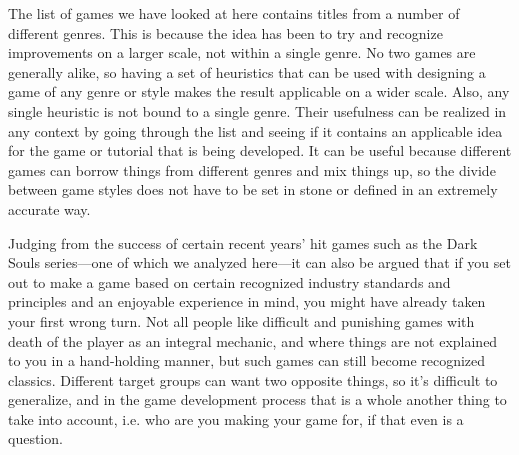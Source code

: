 The list of games we have looked at here contains titles from a number of different genres. This is because the idea has been to try and recognize improvements on a larger scale, not within a single genre. No two games are generally alike, so having a set of heuristics that can be used with designing a game of any genre or style makes the result applicable on a wider scale. Also, any single heuristic is not bound to a single genre. Their usefulness can be realized in any context by going through the list and seeing if it contains an applicable idea for the game or tutorial that is being developed. It can be useful because different games can borrow things from different genres and mix things up, so the divide between game styles does not have to be set in stone or defined in an extremely accurate way. 

Judging from the success of certain recent years' hit games such as the Dark Souls series---one of which we analyzed here---it can also be argued that if you set out to make a game based on certain recognized industry standards and principles and an enjoyable experience in mind, you might have already taken your first wrong turn. Not all people like difficult and punishing games with death of the player as an integral mechanic, and where things are not explained to you in a hand-holding manner, but such games can still become recognized classics. Different target groups can want two opposite things, so it's difficult to generalize, and in the game development process that is a whole another thing to take into account, i.e. who are you making your game for, if that even is a question.
